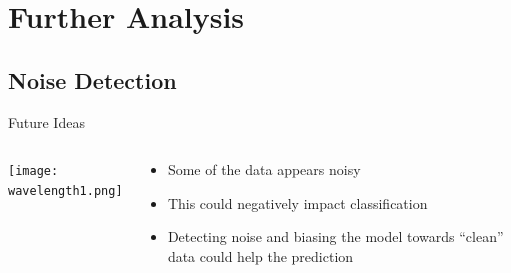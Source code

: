 \documentclass[11pt]{beamer}
\begin{document}

\section{Further Analysis}
\subsection{Noise Detection}
\begin{frame}{Future Ideas}
\begin{columns}[T]
\begin{column}{.48\textwidth}
\texttt{[image: wavelength1.png]}
\end{column}
\hfill
\begin{column}{.48\textwidth}
\begin{itemize}
\item Some of the data appears noisy
\item This could negatively impact classification
\item Detecting noise and biasing the model towards ``clean'' data could help the prediction
\end{itemize}
\end{column}
\end{columns}
\end{frame}
\end{document}
